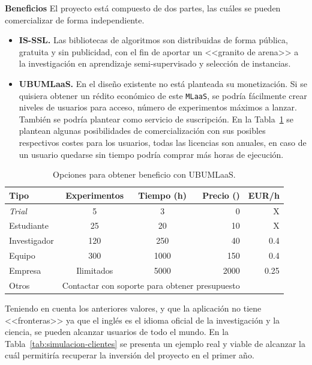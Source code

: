 \textbf{Beneficios}
El proyecto está compuesto de dos partes, las cuáles se pueden comercializar de forma independiente.
\begin{itemize}
\item \textbf{IS-SSL.} Las bibliotecas de algoritmos son distribuidas de forma pública, gratuita y sin publicidad, con el fin de aportar un <<granito de arena>> a la investigación en aprendizaje semi-supervisado y selección de instancias.
\item \textbf{UBUMLaaS.} En el diseño existente no está planteada su monetización. Si se quisiera obtener un rédito económico de este \texttt{MLaaS}, se podría fácilmente crear niveles de usuarios para acceso, número de experimentos máximos a lanzar. También se podría plantear como servicio de suscripción. En la Tabla~\ref{tab:opciones-beneficio} se plantean algunas posibilidades de comercialización con sus posibles respectivos costes para los usuarios, todas las licencias son anuales, en caso de un usuario quedarse sin tiempo podría comprar más horas de ejecución.
\end{itemize}

\begin{table}[H]
\centering
\begin{tabular}{lccrr}
	\toprule
	\textbf{Tipo}          &\textbf{Experimentos} & \textbf{Tiempo (h)} & \textbf{Precio (\officialeuro)} &  EUR/h\\
	\midrule
	\textit{Trial}        & 5 & 3 & 0 & X\\
	Estudiante   & 25 & 20 & 10 & X\\
	Investigador  & 120 & 250 & 40 & 0.4 \\
	Equipo  & 300 & 1000 & 150 & 0.4 \\
	Empresa & Ilimitados & 5000 & 2000 & 0.25 \\
	Otros & \multicolumn{3}{c}{Contactar con soporte para obtener presupuesto} \\
	\bottomrule
\end{tabular}
\caption{Opciones para obtener beneficio con UBUMLaaS.}\label{tab:opciones-beneficio}
\end{table}

Teniendo en cuenta los anteriores valores, y que la aplicación no tiene <<fronteras>> ya que el inglés es el idioma oficial de la investigación y la ciencia, se pueden alcanzar usuarios de todo el mundo. En la Tabla~\ref{tab:simulacion-clientes} se presenta un ejemplo real y viable de alcanzar la cuál permitiría recuperar la inversión del proyecto en el primer año.

